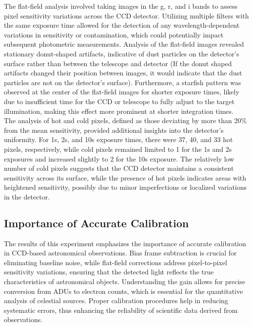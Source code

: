 \documentclass[linenumbers,twocolumn]{aastex631}
\begin{document}
The flat-field analysis involved taking images in the g, r, and i bands to assess pixel sensitivity variations across the CCD detector. Utilizing multiple filters with the same exposure time allowed for the detection of any wavelength-dependent variations in sensitivity or contamination, which could potentially impact subsequent photometric measurements. Analysis of the flat-field images revealed stationary donut-shaped artifacts, indicative of dust particles on the detector's surface rather than between the telescope and detector (If the donut shaped artifacts changed their position between images, it would indicate that the dust particles are not on the detector's surface). Furthermore, a starfish pattern was observed at the center of the flat-field images for shorter exposure times, likely due to insufficient time for the CCD or telescope to fully adjust to the target illumination, making this effect more prominent at shorter integration times. \\

The analysis of hot and cold pixels, defined as those deviating by more than 20\% from the mean sensitivity, provided additional insights into the detector's uniformity. For 1s, 2s, and 10s exposure times, there were 37, 40, and 33 hot pixels, respectively, while cold pixels remained limited to 1 for the 1s and 2s exposures and increased slightly to 2 for the 10s exposure. The relatively low number of cold pixels suggests that the CCD detector maintains a consistent sensitivity across its surface, while the presence of hot pixels indicates areas with heightened sensitivity, possibly due to minor imperfections or localized variations in the detector.

\subsection{Importance of Accurate Calibration}
The results of this experiment emphasizes the importance of accurate calibration in CCD-based astronomical observations. Bias frame subtraction is crucial for eliminating baseline noise, while flat-field corrections address pixel-to-pixel sensitivity variations, ensuring that the detected light reflects the true characteristics of astronomical objects. Understanding the gain allows for precise conversion from ADUs to electron counts, which is essential for the quantitative analysis of celestial sources. Proper calibration procedures help in reducing systematic errors, thus enhancing the reliability of scientific data derived from observations.
\end{document}
